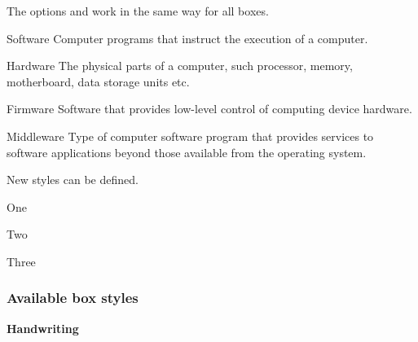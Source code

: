 \documentclass[a4paper, 11pt]{article}
\begin{document}
The options  and  work in the same way for all boxes.

\begin{example}{}
    \begin{PLTBoxRaster}[box = {boxrule = 0pt, halign = center, sharp corners}]
        \item[Software] Computer programs that instruct the execution of a computer.
        \item[Hardware]The physical parts of a computer, such processor, memory, motherboard, data storage units etc.
        \item[Firmware] Software that provides low-level control of computing device hardware.
        \item[Middleware] Type of computer software program that provides services to software applications beyond those available from the operating system.
    \end{PLTBoxRaster}
\end{example}

New styles can be defined.

\begin{example}{}

    \begin{PLTBoxRaster}[my item, raster = {raster width = 0.8\linewidth}]
        \item One
        \item Two
        \item Three
    \end{PLTBoxRaster}
\end{example}


\subsubsection{Available box styles}\label{sec:box-styles}

\noindent\textbf{Handwriting}
\end{document}
